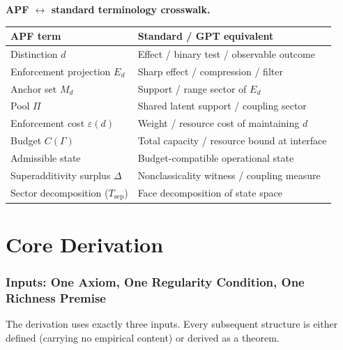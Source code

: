 \documentclass[11pt,a4paper]{article}
\theoremstyle{definition}
\newcommand{\eps}{\varepsilon}
\begin{document}
\medskip\noindent\textbf{APF $\leftrightarrow$ standard terminology crosswalk.}

\smallskip
\begin{center}\small
\renewcommand{\arraystretch}{1.15}
\begin{tabular}{@{}ll@{}}
\toprule
\textbf{APF term} & \textbf{Standard / GPT equivalent} \\
\midrule
Distinction $d$ & Effect / binary test / observable outcome \\
Enforcement projection $E_d$ & Sharp effect / compression / filter \\
Anchor set $M_d$ & Support / range sector of $E_d$ \\
Pool $\Pi$ & Shared latent support / coupling sector \\
Enforcement cost $\eps(d)$ & Weight / resource cost of maintaining $d$ \\
Budget $C(\Gamma)$ & Total capacity / resource bound at interface \\
Admissible state & Budget-compatible operational state \\
Superadditivity surplus $\Delta$ & Nonclassicality witness / coupling measure \\
Sector decomposition ($T_{\mathrm{sep}}$) & Face decomposition of state space \\
\bottomrule
\end{tabular}
\end{center}

\tableofcontents
\newpage


\part{Core Derivation}
\label{part:core}

\section{Inputs: One Axiom, One Regularity Condition, One Richness Premise}
\label{sec:inputs}

The derivation uses exactly three inputs.  Every subsequent structure is either defined (carrying no empirical content) or derived as a theorem.
\end{document}
